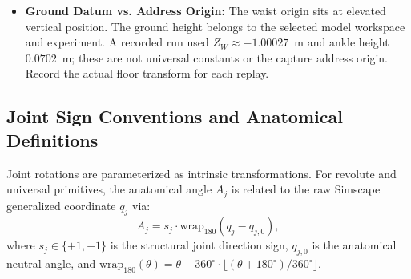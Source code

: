 \documentclass[11pt,a4paper]{article}
\begin{document}
\begin{itemize}
\begin{equation}
    \end{equation}
    The address origin is \textbf{not} the ankle midpoint or ground datum. Point positions transform to local address coordinates via the basis matrix $\mathbf{S} = [\mathbf{s}_{\text{facing}}, \mathbf{s}_{\text{target}}, \mathbf{s}_{\text{up}}]$:
    \begin{equation}
        \mathbf{p}_{\text{addr}} = \mathbf{S}^T (\mathbf{p}_W - \mathbf{p}_{\text{origin}}).
    \end{equation}
    Under this change of frame, forces transform purely by rotation:
    \begin{equation}
        \mathbf{f}_{\text{addr}} = \mathbf{S}^T \mathbf{f}_W,
    \end{equation}
    For a resultant moment $\mathbf{m}_W$ taken about the World origin,
    moments transform by incorporating the lever arm of the origin shift:
    \begin{equation}
        \mathbf{m}_{\text{addr}} = \mathbf{S}^T \mathbf{m}_W - (\mathbf{S}^T \mathbf{p}_{\text{origin}}) \times \mathbf{f}_{\text{addr}}.
    \end{equation}
    \item \textbf{Ground Datum vs. Address Origin:} The waist origin sits at elevated vertical position. The ground height belongs to the selected model workspace and experiment. A recorded run used $Z_W \approx -1.00027$~m and ankle height $0.0702$~m; these are not universal constants or the capture address origin. Record the actual floor transform for each replay.
\end{itemize}

\subsection{Joint Sign Conventions and Anatomical Definitions}
Joint rotations are parameterized as intrinsic transformations. For revolute and universal primitives, the anatomical angle $A_j$ is related to the raw Simscape generalized coordinate $q_j$ via:
\begin{equation}
    A_j = s_j \cdot \text{wrap}_{180}(q_j - q_{j,0}),
\end{equation}
where $s_j \in \{+1, -1\}$ is the structural joint direction sign, $q_{j,0}$ is the anatomical neutral angle, and $\text{wrap}_{180}(\theta) = \theta - 360^\circ \cdot \lfloor(\theta + 180^\circ)/360^\circ\rfloor$.
\end{document}
